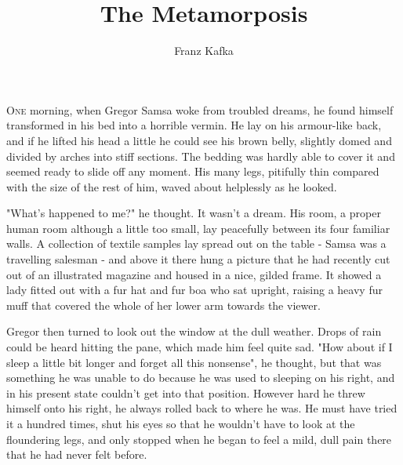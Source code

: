 \documentclass[11pt,openany]{memoir}
\begin{document}
\title{The Metamorposis}
\author{Franz Kafka}
\date{}

\maketitle



\chapter{}

\lettrine[lines=3]{O}{ne} morning, when Gregor Samsa woke from troubled dreams, he found
himself transformed in his bed into a horrible vermin.  He lay on
his armour-like back, and if he lifted his head a little he could
see his brown belly, slightly domed and divided by arches into stiff
sections.  The bedding was hardly able to cover it and seemed ready
to slide off any moment.  His many legs, pitifully thin compared
with the size of the rest of him, waved about helplessly as he
looked.

"What's happened to me?" he thought.  It wasn't a dream.  His room,
a proper human room although a little too small, lay peacefully
between its four familiar walls.  A collection of textile samples
lay spread out on the table - Samsa was a travelling salesman - and
above it there hung a picture that he had recently cut out of an
illustrated magazine and housed in a nice, gilded frame.  It showed
a lady fitted out with a fur hat and fur boa who sat upright,
raising a heavy fur muff that covered the whole of her lower arm
towards the viewer.

Gregor then turned to look out the window at the dull weather.
Drops of rain could be heard hitting the pane, which made him feel
quite sad.  "How about if I sleep a little bit longer and forget all
this nonsense", he thought, but that was something he was unable to
do because he was used to sleeping on his right, and in his present
state couldn't get into that position.  However hard he threw
himself onto his right, he always rolled back to where he was.  He
must have tried it a hundred times, shut his eyes so that he
wouldn't have to look at the floundering legs, and only stopped when
he began to feel a mild, dull pain there that he had never felt
before.

\chapter{}
\end{document}
